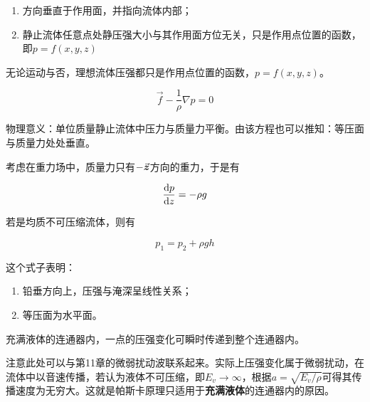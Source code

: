 


\begin{enumerate}
	\item 方向垂直于作用面，并指向流体内部；
	\item    静止流体任意点处静压强大小与其作用面方位无关，只是作用点位置的函数，即$p = f(x, y, z)$
\end{enumerate}


无论运动与否，理想流体压强都只是作用点位置的函数，$p = f(x, y, z)$。


\begin{equation}
	\vec{f} - \dfrac{1}{\rho} \nabla p = 0 \label{eq2.1}
\end{equation}

物理意义：单位质量静止流体中压力与质量力平衡。由该方程也可以推知：等压面与质量力处处垂直。

考虑在重力场中，质量力只有$-\va*{z}$方向的重力，于是有

\begin{equation}
	\dv{p}{z} = -\rho g
\end{equation}

若是均质不可压缩流体，则有

\begin{equation}
	p_1 = p_2 + \rho g h
\end{equation}

这个式子表明：

\begin{enumerate}
	\item 铅垂方向上，压强与淹深呈线性关系；
	\item 等压面为水平面。
\end{enumerate}


\begin{theorem}[帕斯卡原理]
	充满液体的连通器内，一点的压强变化可瞬时传递到整个连通器内。
\end{theorem}

\begin{tip}
	注意此处可以与第11章的微弱扰动波联系起来。实际上压强变化属于微弱扰动，在流体中以音速传播，若认为液体不可压缩，即$E_v \to \infty$，根据$a = \sqrt{E_v/\rho}$可得其传播速度为无穷大。这就是帕斯卡原理只适用于\textbf{充满液体}的连通器内的原因。
\end{tip}

